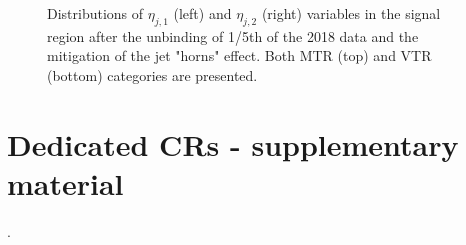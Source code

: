 \begin{figure}[htbp]
{    }
  \caption{Distributions of $\eta_{j, 1}$ (left) and $\eta_{j, 2}$ (right) variables in the signal region after the unbinding of 1/5th of the 2018 data and the mitigation of the jet "horns" effect. Both MTR (top) and VTR (bottom) categories are presented.}
  \label{fig:jet_eta_postHornCut_2018}
\end{figure}

\newpage



\section{Dedicated CRs - supplementary material}
\label{app:CRs}.

